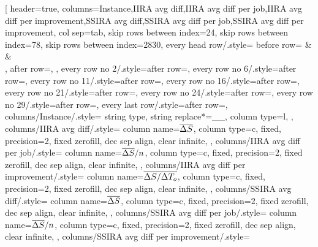 \begin{table}[p]
    \centering
    \pgfplotstabletypeset[
        header=true, %
        columns={Instance,{IIRA avg diff},{IIRA avg diff per job},{IIRA avg diff per improvement},{SSIRA avg diff},{SSIRA avg diff per job},{SSIRA avg diff per improvement}},
        col sep=tab, %
        skip rows between index={2}{4},
        skip rows between index={7}{8},
        skip rows between index={28}{30},
        every head row/.style={
            before row={
            \toprule
            &  &  \\
            },
            after row=\midrule,
        },
        every row no 2/.style={after row={\midrule}},
        every row no 6/.style={after row={\midrule}},
        every row no 11/.style={after row={\midrule}},
        every row no 16/.style={after row={\midrule}},
        every row no 21/.style={after row={\midrule}},
        every row no 24/.style={after row={\midrule}},
        every row no 29/.style={after row={\midrule}},
        every last row/.style={after row={\bottomrule}},
        columns/Instance/.style={
            string type,
            string replace*={_}{\_},
            column type=l,
            },
        columns/IIRA avg diff/.style={
            column name=$\overline{\Delta S_{}}$,
            column type=c,
            fixed, precision=2,
            fixed zerofill,
            dec sep align,
            clear infinite,
            },
        columns/IIRA avg diff per job/.style={
            column name=$\overline{\Delta S_{}} / n$,
            column type=c,
            fixed, precision=2,
            fixed zerofill,
            dec sep align,
            clear infinite,
            },
        columns/IIRA avg diff per improvement/.style={
            column name=$\overline{\Delta S_{} / \Delta T_{o}}$,
            column type=c,
            fixed, precision=2,
            fixed zerofill,
            dec sep align,
            clear infinite,
            },
        columns/SSIRA avg diff/.style={
            column name=$\overline{\Delta S_{}}$,
            column type=c,
            fixed, precision=2,
            fixed zerofill,
            dec sep align,
            clear infinite,
            },
        columns/SSIRA avg diff per job/.style={
            column name=$\overline{\Delta S_{}} / n$,
            column type=c,
            fixed, precision=2,
            fixed zerofill,
            dec sep align,
            clear infinite,
            },
        columns/SSIRA avg diff per improvement/.style={
}
\end{table}
